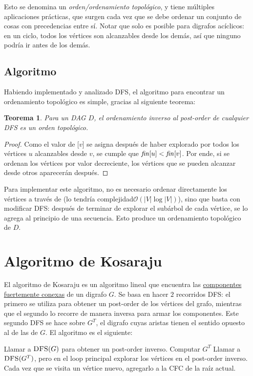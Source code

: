 \documentclass[a4paper]{report}
\newcommand{\BigO}[1]{\ensuremath{\mathcal{O}(#1)}}
\newtheorem*{theorem*}{Teorema}
\begin{document}
Esto se denomina un \textit{orden/ordenamiento topológico}, y tiene múltiples aplicaciones prácticas, que surgen cada vez que se debe ordenar un conjunto de cosas con precedencias entre sí. Notar que solo es posible para digrafos acíclicos: en un ciclo, todos los vértices son alcanzables desde los demás, así que ninguno podría ir antes de los demás.

\subsection{Algoritmo}

Habiendo implementado y analizado DFS, el algoritmo para encontrar un ordenamiento topológico es simple, gracias al siguiente teorema:

\begin{theorem*}
    Para un DAG $D$, el ordenamiento inverso al post-order de cualquier DFS es un orden topológico.
\end{theorem*}
\begin{proof}
    Como el valor de [$v$] se asigna después de haber explorado por todos los vértices $u$ alcanzables desde $v$, se cumple que $\id{fin}[u] < \id{fin}[v]$. Por ende, si se ordenan los vértices por valor  decreciente, los vértices que se pueden alcanzar desde otros aparecerán después.
\end{proof}

Para implementar este algoritmo, no es necesario ordenar directamente los vértices a través de  (lo tendría complejidad\BigO{|V|\log{|V|}}), sino que basta con modificar DFS: después de terminar de explorar el subárbol de cada vértice, se lo agrega al principio de una secuencia. Esto produce un ordenamiento topológico de $D$.

\section{Algoritmo de Kosaraju}

El algoritmo de Kosaraju es un algoritmo lineal que encuentra las \hyperref[recorridos-digrafos]{componentes fuertemente conexas} de un digrafo $G$. Se basa en hacer $2$ recorridos DFS: el primero se utiliza para obtener un post-order de los vértices del grafo, mientras que el segundo lo recorre de manera inversa para armar los componentes. Este segundo DFS se hace sobre $G^T$, el digrafo cuyas aristas tienen el sentido opuesto al de las de $G$. El algoritmo es el siguiente:

\begin{codebox}
    \li Llamar a $\textnormal{\scshape DFS}(G)$ para obtener un post-order inverso.
    \li Computar $G^T$
    \li Llamar a $\textnormal{\scshape DFS}(G^T)$, pero en el loop principal explorar los vértices en el post-order inverso.
    \zi Cada vez que se visita un vértice nuevo, agregarlo a la CFC de la raíz actual.
\end{codebox}
\end{document}
